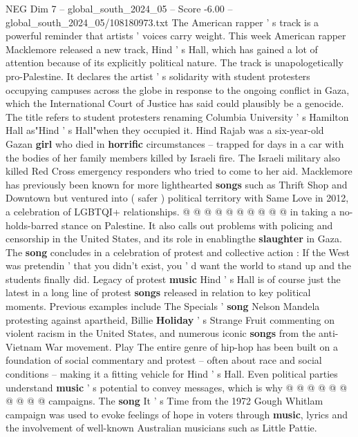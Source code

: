 \begin{textsample}{NEG Dim 7 – global\_south\_2024\_05 – Score -6.00 – global\_south\_2024\_05/108180973.txt}  \label{ex:f7_neg_385}
The American rapper ' s track is a powerful reminder that artists ' voices carry weight.
This week American rapper Macklemore released a new track, Hind ' s Hall, which has gained a lot of attention because of its explicitly political nature.
The track is unapologetically pro-Palestine.
It declares the artist ' s solidarity with student protesters occupying campuses across the globe in response to the ongoing conflict in Gaza, which the International Court of Justice has said could plausibly be a genocide.
The title refers to student protesters renaming Columbia University ' s Hamilton Hall as"Hind ' s Hall"when they occupied it.
Hind Rajab was a six-year-old Gazan \textbf{girl} who died in \textbf{horrific} circumstances -- trapped for days in a car with the bodies of her family members killed by Israeli fire.
The Israeli military also killed Red Cross emergency responders who tried to come to her aid.
Macklemore has previously been known for more lighthearted \textbf{songs} such as Thrift Shop and Downtown but ventured into ( safer ) political territory with Same Love in 2012, a celebration of LGBTQI+ relationships. @ @ @ @ @ @ @ @ @ @ in taking a no-holds-barred stance on Palestine.
It also calls out problems with policing and censorship in the United States, and its role in enablingthe \textbf{slaughter} in Gaza.
The \textbf{song} concludes in a celebration of protest and collective action : If the West was pretendin ' that you didn't exist, you ' d want the world to stand up and the students finally did.
Legacy of protest \textbf{music} Hind ' s Hall is of course just the latest in a long line of protest \textbf{songs} released in relation to key political moments.
Previous examples include The Specials ' \textbf{song} Nelson Mandela protesting against apartheid, Billie \textbf{Holiday} ' s Strange Fruit commenting on violent racism in the United States, and numerous iconic \textbf{songs} from the anti-Vietnam War movement.
Play The entire genre of hip-hop has been built on a foundation of social commentary and protest -- often about race and social conditions -- making it a fitting vehicle for Hind ' s Hall.
Even political parties understand \textbf{music} ' s potential to convey messages, which is why @ @ @ @ @ @ @ @ @ @ campaigns.
The \textbf{song} It ' s Time from the 1972 Gough Whitlam campaign was used to evoke feelings of hope in voters through \textbf{music}, lyrics and the involvement of well-known Australian musicians such as Little Pattie.

\end{textsample}
